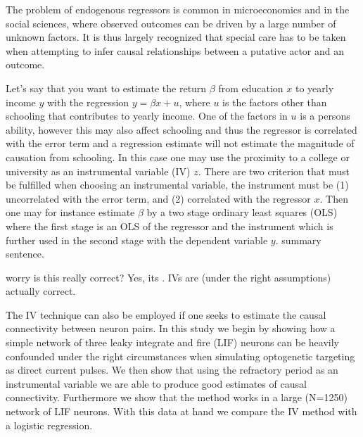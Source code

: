 \documentclass[11pt]{article}
\begin{document}
The problem of endogenous regressors is common in microeconomics and in the social sciences, where observed outcomes can be driven by a large number of unknown factors. It is thus largely recognized that special care has to be taken when attempting to infer causal relationships between a putative actor and an outcome. 

Let's say that you want to estimate the return $ \beta $ from education $ x $ to yearly income $ y $ with the regression $ y = \beta x + u $, where $ u $ is the factors other than schooling that contributes to yearly income. One of the factors in $ u $ is a persons ability, however this may also affect schooling and thus the regressor is correlated with the error term and a regression estimate will not estimate the magnitude of causation from schooling. In this case one may use the proximity to a college or university as an instrumental variable (IV) $ z $. There are two criterion that must be fulfilled when choosing an instrumental variable, the instrument must be (1) uncorrelated with the error term, and (2) correlated with the regressor $ x $. Then one may for instance estimate $ \beta $ by a two stage ordinary least squares (OLS) where the first stage is an OLS of the regressor and the instrument which is further used in the second stage with the dependent variable $ y $. summary sentence.

worry is this really correct? Yes, its . IVs are (under the right assumptions) actually correct.

The IV technique can also be employed if one seeks to estimate the causal connectivity between neuron pairs. In this study we begin by showing how a simple network of three leaky integrate and fire (LIF) neurons can be heavily confounded under the right circumstances when simulating optogenetic targeting as direct current pulses. We then show that using the refractory period as an instrumental variable we are able to produce good estimates of causal connectivity. Furthermore we show that the method works in a large (N=1250) network of LIF neurons. With this data at hand we compare the IV method with a logistic regression.
\end{document}
